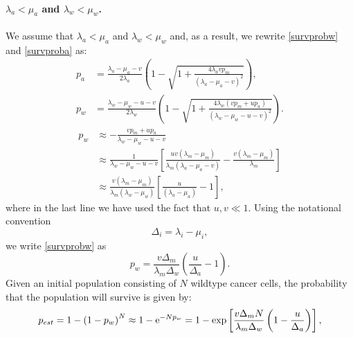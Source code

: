 \documentclass[12pt]{extarticle}
\newcommand{\e}{{\rm e}}
\begin{document}
\paragraph{$\lambda_a<\mu_a$ and $\lambda_w<\mu_w$.}
We assume that $\lambda_a<\mu_a$ and $\lambda_w<\mu_w$ and, as a result, we rewrite \eqref{survprobw} and \eqref{survproba} as:
\begin{align*}
p_a&=\frac{\lambda_a-\mu_a-v}{2\lambda_a}\left(1-\sqrt{1+\frac{4\lambda_avp_m}{\left(\lambda_a-\mu_a-v\right)^2}}\right),\\
p_w&=\frac{\lambda_w-\mu_w-u-v}{2\lambda_w}\left(1-\sqrt{1+\frac{4\lambda_w\left(vp_m+up_a\right)}{\left(\lambda_w-\mu_w-u-v\right)^2}}\right).
\end{align*}
\begin{align}\label{survprobwinitial}
p_w&\approx-\frac{vp_m+up_a}{\lambda_w-\mu_w-u-v}\\
\nonumber
&\approx\frac{1}{\lambda_w-\mu_w-u-v}\left[\frac{uv\left(\lambda_m-\mu_m\right)}{\lambda_m\left(\lambda_a-\mu_a-v\right)}-\frac{v\left(\lambda_m-\mu_m\right)}{\lambda_m}\right]\\ \label{survprobw2}
&\approx\frac{v\left(\lambda_m-\mu_m\right)}{\lambda_m\left(\lambda_w-\mu_w\right)}\left[\frac{u}{\left(\lambda_a-\mu_a\right)}-1\right],
\end{align}
where in the last line we have used the fact that $u,v\ll1$. Using the notational convention
\begin{equation}\label{notationalconv}
\Delta_i=\lambda_i-\mu_i,
\end{equation}
we write \eqref{survprobw} as
\begin{equation}\label{survprobwapprox2}
p_w=\frac{v\Delta_m}{\lambda_m\Delta_w}\left(\frac{u}{\Delta_a}-1\right).
\end{equation}
Given an initial population consisting of $N$ wildtype cancer cells, the probability that the population will survive is given by: 
\begin{align}\label{AneuploidyDeleteriousApprox}
p_{est}=1-\left(1-p_w\right)^N\approx 1-\e^{-Np_w}=1-\exp\left[\frac{v\Delta_mN}{\lambda_m\Delta_w}\left(1-\frac{u}{\Delta_a}\right)\right],
\end{align}
\end{document}
